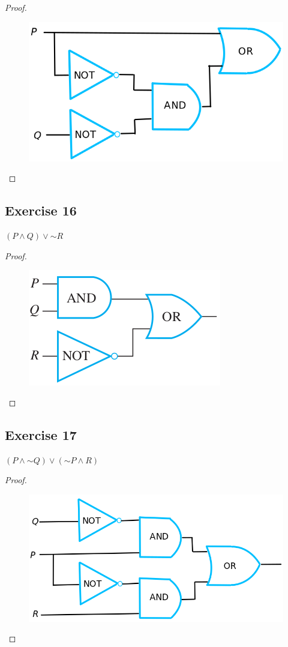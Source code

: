 \documentclass[14pt]{extarticle}
\begin{document}
\begin{proof} 
\begin{figure}[ht!] 
\centering
\includegraphics[scale=0.3]{../images/2.4.15.png} 
\end{figure} 
\end{proof}

\subsection{Exercise 16} 
$(P \wedge Q) \vee {\sim R}$

\begin{proof} 
\begin{figure}[ht!]
\centering
\includegraphics[scale=0.5]{../images/2.4.16.png} 
\end{figure} 
\end{proof}

\subsection{Exercise 17} 
$(P \wedge {\sim Q}) \vee ({\sim P} \wedge R)$

\begin{proof} 
\begin{figure}[ht!] 
\centering
\includegraphics[scale=0.3]{../images/2.4.17.png} 
\end{figure} 
\end{proof}
\end{document}
